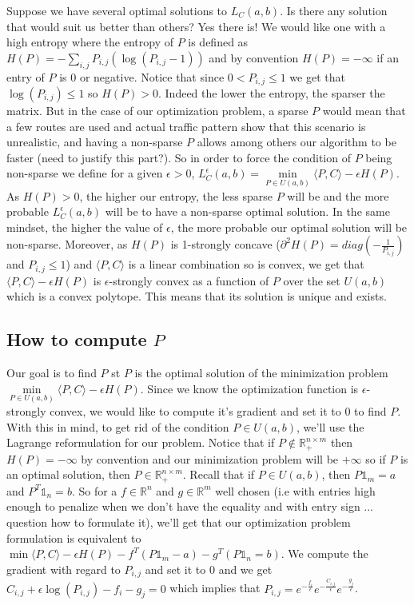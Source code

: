 \documentclass[a4paper]{article}
\theoremstyle{definition}
\theoremstyle{remark}
\newcommand{\R}{\mathbb{R}}
\begin{document}
Suppose we have several optimal solutions to $L_C(a,b)$. Is there any solution that would suit us better than others? Yes there is! We would like one with a high entropy where the entropy of $P$ is defined as $H(P)=-\sum\limits_{i,j}P_{i,j}(\log(P_{i,j}-1))$ and by convention $H(P)=-\infty$ if an entry of $P$ is 0 or negative. Notice that since $0<P_{i,j}\leq 1$ we get that $\log(P_{i,j})\leq 1$ so $H(P)>0$. Indeed the lower the entropy, the sparser the matrix. But in the case of our optimization problem, a sparse $P$ would mean that a few routes are used and actual traffic pattern show that this scenario is unrealistic, and having a non-sparse $P$ allows among others our algorithm to be faster (need to justify this part?). So in order to force the condition of $P$ being non-sparse we define for a given $\epsilon>0$, $L_C^{\epsilon}(a,b)=\min\limits_{P\in U(a,b)}\langle P,C \rangle-\epsilon H(P)$. As $H(P)>0$, the higher our entropy, the less sparse $P$ will be and the more probable $L_C^{\epsilon}(a,b)$ will be to have a non-sparse optimal solution. In the same mindset, the higher the value of $\epsilon$, the more probable our optimal solution will be non-sparse. Moreover, as $H(P)$ is 1-strongly concave ($\partial ^2H(P)=diag(-\frac{1}{P_{i,j}})$ and $P_{i,j}\leq 1$) and $\langle P,C \rangle$ is a linear combination so is convex, we get that $\langle P,C \rangle-\epsilon H(P)$ is $\epsilon$-strongly convex as a function of $P$ over the set $U(a,b)$ which is a convex polytope. This means that its solution is unique and exists. 

\subsection*{How to compute $P$}

Our goal is to find $P$ st $P$ is the optimal solution of the minimization problem $\min\limits_{P\in U(a,b)}\langle P,C \rangle-\epsilon H(P)$. Since we know the optimization function is $\epsilon$-strongly convex, we would like to compute it's gradient and set it to 0 to find $P$. With this in mind, to get rid of the condition $P\in U(a,b)$, we'll use the Lagrange reformulation for our problem. Notice that if $P\notin \R^{n\times m}_+$ then $H(P)=-\infty$ by convention and our minimization problem will be $+\infty$ so if $P$ is an optimal solution, then $P\in \R^{n\times m}_+$. Recall that if $P\in U(a,b)$, then $P\mathbb{1}_m=a$ and $P^T\mathbb{1}_n=b$.  So for a $f\in \R^n$ and $g\in \R^m$ well chosen (i.e with entries high enough to penalize when we don't have the equality and with entry sign ... question how to formulate it), we'll get that our optimization problem formulation is equivalent to $\min \langle P,C \rangle-\epsilon H(P)-f^T(P\mathbb{1}_m-a)-g^T(P\mathbb{1}_n=b)$. We compute the gradient with regard to $P_{i,j}$ and set it to 0 and we get $C_{i,j}+\epsilon \log(P_{i,j})-f_i-g_j=0$ which implies that $P_{i,j}=e^{-\frac{f_i}{\epsilon}}e^{-\frac{C_{i,j}}{\epsilon}}e^{-\frac{g_j}{\epsilon}}$. 
\end{document}
